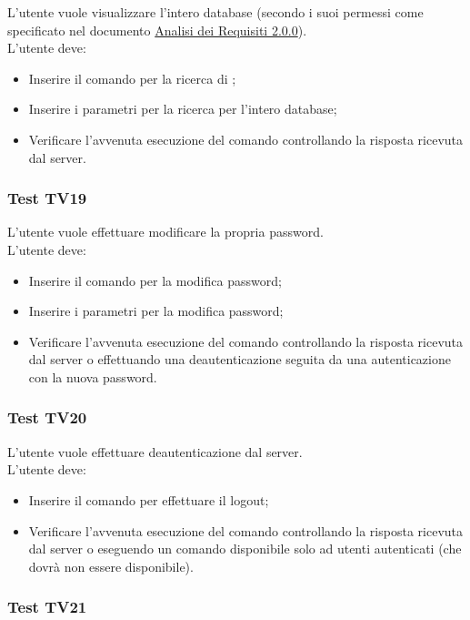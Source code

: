 \documentclass{scalatekids-article}
\begin{document}
L'utente vuole visualizzare l'intero database (secondo i suoi permessi come specificato nel documento \href{run:../Esterni/AnalisiDeiRequisiti\_v2.0.0.pdf}{Analisi dei Requisiti 2.0.0}).\\
L'utente deve:
\begin{itemize}
\item Inserire il comando per la ricerca di ;
\item Inserire i parametri per la ricerca per l'intero database;
\item Verificare l'avvenuta esecuzione del comando controllando la risposta ricevuta dal server.
\end{itemize}

\subsubsection{Test TV19}

L'utente vuole effettuare modificare la propria password.\\
L'utente deve:
\begin{itemize}
\item Inserire il comando per la modifica password;
\item Inserire i parametri per la modifica password;
\item Verificare l'avvenuta esecuzione del comando controllando la risposta ricevuta dal server o effettuando una deautenticazione seguita da una autenticazione con la nuova password.
\end{itemize}

\subsubsection{Test TV20}

L'utente vuole effettuare deautenticazione dal server.\\
L'utente deve:
\begin{itemize}
\item Inserire il comando per effettuare il logout;
\item Verificare l'avvenuta esecuzione del comando controllando la risposta ricevuta dal server o eseguendo un comando disponibile solo ad utenti autenticati (che dovrà non essere disponibile).
\end{itemize}

\subsubsection{Test TV21}
\end{document}
